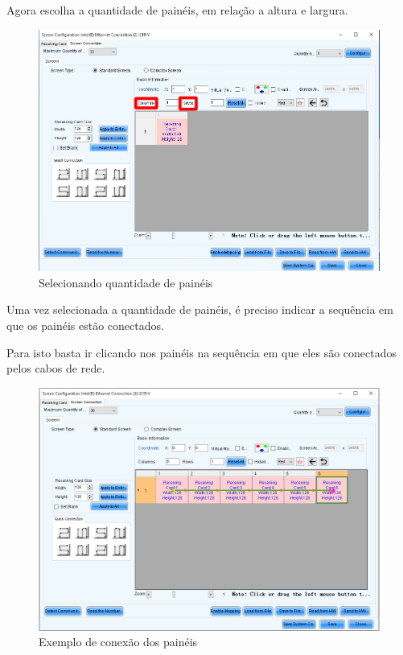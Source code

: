 \documentclass[12pt, a4paper]{article}
\begin{document}
\newpage

Agora escolha a quantidade de painéis, em relação a altura e largura.

\begin{figure}[!htb]
	\centering
	\includegraphics[width=\textwidth]{qntPaineis.jpeg}
	\caption{\label{fig:qntPaineis.jpeg}Selecionando quantidade de painéis}
\end{figure}
\newpage

Uma vez selecionada a quantidade de painéis, é preciso indicar a sequência em que os painéis estão conectados.

Para isto basta ir clicando nos painéis na sequência em que eles são conectados pelos cabos de rede.

\begin{figure}[!htb]
	\centering
	\includegraphics[width=\textwidth]{conexao.jpeg}
	\caption{\label{fig:}Exemplo de conexão dos painéis}
\end{figure}
\end{document}
